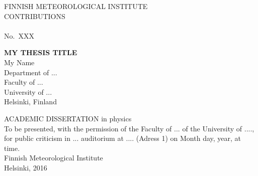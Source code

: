 \documentclass[11pt,b5paper]{book}
\begin{document}
\sloppy


\noindent{}FINNISH METEOROLOGICAL INSTITUTE \\
\noindent{}CONTRIBUTIONS \\
\\
No.~XXX
\vspace*{2.5cm}

\begin{center}
  \normalsize{\textbf{MY THESIS TITLE}} \\
  \vspace*{.5cm}  
  \normalsize{My Name} \\
  \vspace*{1.3cm}
  \normalsize{Department of ...} \\
  \normalsize{Faculty of ...} \\
  \normalsize{University of ...} \\
  \normalsize{Helsinki, Finland} \\
\end{center}
\vspace*{3cm}
\noindent{}\scriptsize{ACADEMIC DISSERTATION} \footnotesize{in physics} \\

\noindent{}\footnotesize{To be presented, with the permission of the Faculty of ... of the University of ...., for public 
criticism in ... auditorium at .... (Adress 1) on Month day, year, at time.} \\

\vspace{1cm}
\noindent{}\footnotesize{Finnish Meteorological Institute}\\
\noindent{}\footnotesize{Helsinki, 2016} 

\thispagestyle{empty}
\setcounter{page}{1}
\end{document}
